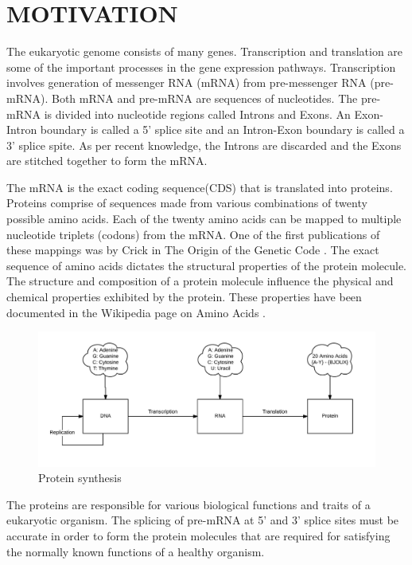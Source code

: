 \documentclass[12pt,a4paper]{article}
\begin{document}
    \thispagestyle{empty}
	\newpage
	
	\tableofcontents
	\thispagestyle{empty}
	\newpage
	
	\clearpage
    \doublespacing
	\section{\large MOTIVATION}
    The eukaryotic genome consists of many genes. Transcription and translation are some of the important processes in the gene expression pathways. Transcription involves generation of messenger RNA (mRNA) from pre-messenger RNA (pre-mRNA). Both mRNA and pre-mRNA are sequences of nucleotides. The pre-mRNA is divided into nucleotide regions called Introns and Exons. An Exon-Intron boundary is called a 5’ splice site and an Intron-Exon boundary is called a 3’ splice spite. As per recent knowledge, the Introns are discarded and the Exons are stitched together to form the mRNA. \par
    The mRNA is the exact coding sequence(CDS) that is translated into proteins. Proteins comprise of sequences made from various combinations of twenty possible amino acids. Each of the twenty amino acids can be mapped to multiple nucleotide triplets (codons) from the mRNA. One of the first publications of these mappings was by Crick in The Origin of the Genetic Code \cite{crick1}. The exact sequence of amino acids dictates the structural properties of the protein molecule. The structure and composition of a protein molecule influence the physical and chemical properties exhibited by the protein. These properties have been documented in the Wikipedia page on Amino Acids \cite{wiki-aminoacids}. \par
	\begin{figure}[h]
		\includegraphics[width=\textwidth]{synthesis}
		\caption{Protein synthesis}
		\centering
	\end{figure}
	The proteins are responsible for various biological functions and traits of a eukaryotic organism. The splicing of pre-mRNA at 5’ and 3’ splice sites must be accurate in order to form the protein molecules that are required for satisfying the normally known functions of a healthy organism. \par
\end{document}
